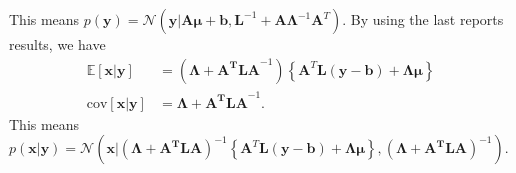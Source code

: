 \documentclass{article}
\begin{document}
    This means $p(\mathbf{y}) = \mathcal{N}(\mathbf{y}|\mathbf{A}\boldsymbol{\mu}+\mathbf{b},\mathbf{L}^{-1}+\mathbf{A}\boldsymbol{\Lambda}^{-1}\mathbf{A}^T)$. By using the last reports results, we have 
    \begin{align}
    \mathds{E}[\mathbf{x|y}] &= (\boldsymbol{\Lambda}+\mathbf{A^TLA}^{-1})\left\{\mathbf{A}^T\mathbf{L(y-b)}+\boldsymbol{\Lambda\mu}\right\}\\
    \text{cov}[\mathbf{x|y}] &= \boldsymbol{\Lambda}+\mathbf{A^TLA}^{-1}. 
    \end{align}
    This means $p(\mathbf{x|y}) = \mathcal{N}\left(\mathbf{x}|\left(\boldsymbol{\Lambda}+\mathbf{A^TLA}\right)^{-1}\left\{\mathbf{A}^T\mathbf{L(y-b)}+\boldsymbol{\Lambda\mu}\right\},\left(\boldsymbol{\Lambda}+\mathbf{A^TLA}\right)^{-1}\right)$.
    
      
\end{document}
